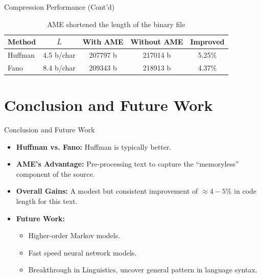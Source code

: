 \documentclass[mathserif, 13pt, aspectratio=1610]{beamer}
\begin{document}
\begin{frame}{Compression Performance (Cont'd)}
	\begin{table}[h!]
		\small
		\caption{AME shortened the length of the binary file}
		\label{tab:amematrics}
		\centering
		\begin{tabular}{l|cccc}
		\toprule
		\textbf{Method} & \textbf{$\bar{L}$} & \textbf{With AME} & \textbf{Without AME} & \textbf{Improved} \\ \hline
		Huffman & 4.5 b/char & 207797 b & 217014 b & 5.25\%  \\ 
		Fano & 8.4 b/char & 209343 b & 218913 b & 4.37\% \\ 
		\bottomrule
		\end{tabular}
	\end{table}
\end{frame}


\section{Conclusion and Future Work}
\begin{frame}{Conclusion and Future Work}
	\begin{itemize}
		\item \textbf{Huffman vs. Fano:} Huffman is typically better.
		\item \textbf{AME's Advantage:} Pre-processing text to capture the ``memoryless'' component of the source.
		\item \textbf{Overall Gains:} A modest but consistent improvement of \(\approx4-5\%\) in code length for this text. 
		\item \textbf{Future Work:}
		\begin{itemize}
			\item Higher-order Markov models.
			\item Fast speed neural network models.
			\item Breakthrough in Linguistics, uncover general pattern in language syntax.
		\end{itemize}
	\end{itemize}
\end{frame}
\end{document}
